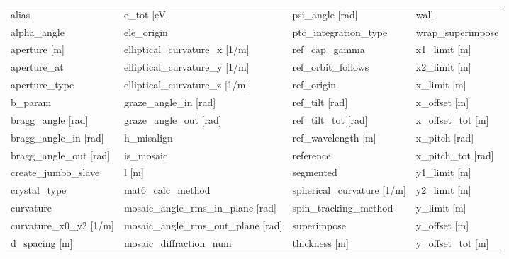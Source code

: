  \begin{tabular}{llll} \toprule
alias                            & e_tot [eV]                       & psi_angle [rad]                  & wall                             \\
alpha_angle                      & ele_origin                       & ptc_integration_type             & wrap_superimpose                 \\
aperture [m]                     & elliptical_curvature_x [1/m]     & ref_cap_gamma                    & x1_limit [m]                     \\
aperture_at                      & elliptical_curvature_y [1/m]     & ref_orbit_follows                & x2_limit [m]                     \\
aperture_type                    & elliptical_curvature_z [1/m]     & ref_origin                       & x_limit [m]                      \\
b_param                          & graze_angle_in [rad]             & ref_tilt [rad]                   & x_offset [m]                     \\
bragg_angle [rad]                & graze_angle_out [rad]            & ref_tilt_tot [rad]               & x_offset_tot [m]                 \\
bragg_angle_in [rad]             & h_misalign                       & ref_wavelength [m]               & x_pitch [rad]                    \\
bragg_angle_out [rad]            & is_mosaic                        & reference                        & x_pitch_tot [rad]                \\
create_jumbo_slave               & l [m]                            & segmented                        & y1_limit [m]                     \\
crystal_type                     & mat6_calc_method                 & spherical_curvature [1/m]        & y2_limit [m]                     \\
curvature                        & mosaic_angle_rms_in_plane [rad]  & spin_tracking_method             & y_limit [m]                      \\
curvature_x0_y2 [1/m]            & mosaic_angle_rms_out_plane [rad] & superimpose                      & y_offset [m]                     \\
d_spacing [m]                    & mosaic_diffraction_num           & thickness [m]                    & y_offset_tot [m]                 \\

\end{tabular}
